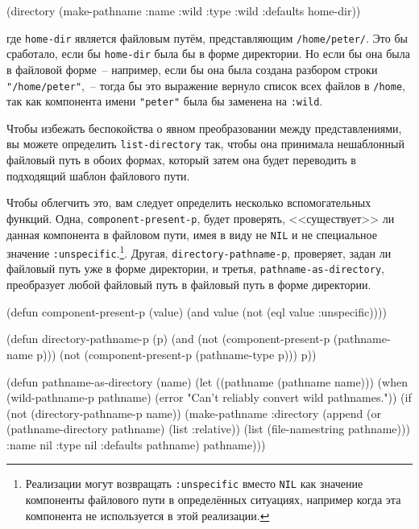 \begin{myverb}
  (directory (make-pathname :name :wild :type :wild :defaults home-dir))
\end{myverb}

\noindent{}где \lstinline{home-dir} является файловым путём, представляющим \lstinline{/home/peter/}. Это бы
сработало, если бы \lstinline{home-dir} была бы в форме директории. Но если бы она была в
файловой форме~-- например, если бы она была создана разбором строки
\lstinline{"/home/peter"},~-- тогда бы это выражение вернуло список всех файлов в
\lstinline{/home}, так как компонента имени \lstinline{"peter"} была бы заменена на
\lstinline{:wild}.

Чтобы избежать беспокойства о явном преобразовании между представлениями, вы можете
определить \lstinline{list-directory} так, чтобы она принимала нешаблонный файловый путь в
обоих формах, который затем она будет переводить в подходящий шаблон файлового пути.

Чтобы облегчить это, вам следует определить несколько вспомогательных функций. Одна,
\lstinline{component-present-p}, будет проверять, <<существует>> ли данная компонента в файловом
пути, имея в виду не \lstinline{NIL} и не специальное значение
\lstinline{:unspecific}.\footnote{Реализации могут возвращать \lstinline{:unspecific} вместо
  \lstinline{NIL} как значение компоненты файлового пути в определённых ситуациях, например
  когда эта компонента не используется в этой реализации.}. Другая,
\lstinline{directory-pathname-p}, проверяет, задан ли файловый путь уже в форме директории, и
третья, \lstinline{pathname-as-directory}, преобразует любой файловый путь в файловый путь в
форме директории.

\begin{myverb}
  (defun component-present-p (value)
    (and value (not (eql value :unspecific))))

  (defun directory-pathname-p  (p)
    (and
     (not (component-present-p (pathname-name p)))
     (not (component-present-p (pathname-type p)))
     p))

  (defun pathname-as-directory (name)
    (let ((pathname (pathname name)))
      (when (wild-pathname-p pathname)
        (error "Can't reliably convert wild pathnames."))
      (if (not (directory-pathname-p name))
        (make-pathname
         :directory (append (or (pathname-directory pathname) (list :relative))
                            (list (file-namestring pathname)))
         :name      nil
         :type      nil
         :defaults pathname)
        pathname)))
\end{myverb}

